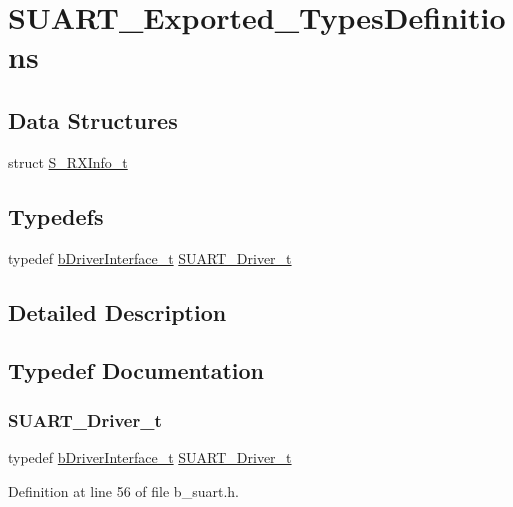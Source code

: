 \hypertarget{group___s_u_a_r_t___exported___types_definitions}{}\section{S\+U\+A\+R\+T\+\_\+\+Exported\+\_\+\+Types\+Definitions}
\label{group___s_u_a_r_t___exported___types_definitions}
\subsection*{Data Structures}
\begin{DoxyCompactItemize}
\item 
struct \mbox{\hyperlink{struct_s___r_x_info__t}{S\+\_\+\+R\+X\+Info\+\_\+t}}
\end{DoxyCompactItemize}
\subsection*{Typedefs}
\begin{DoxyCompactItemize}
\item 
typedef \mbox{\hyperlink{structb_driver_interface__t}{b\+Driver\+Interface\+\_\+t}} \mbox{\hyperlink{group___s_u_a_r_t___exported___types_definitions_ga76678b78633641a143ec958271e0bc05}{S\+U\+A\+R\+T\+\_\+\+Driver\+\_\+t}}
\end{DoxyCompactItemize}


\subsection{Detailed Description}


\subsection{Typedef Documentation}
\mbox{\label{group___s_u_a_r_t___exported___types_definitions_ga76678b78633641a143ec958271e0bc05}} 
\subsubsection{\texorpdfstring{S\+U\+A\+R\+T\+\_\+\+Driver\+\_\+t}{SUART\_Driver\_t}}
{\footnotesize\ttfamily typedef \mbox{\hyperlink{structb_driver_interface__t}{b\+Driver\+Interface\+\_\+t}} \mbox{\hyperlink{group___s_u_a_r_t___exported___types_definitions_ga76678b78633641a143ec958271e0bc05}{S\+U\+A\+R\+T\+\_\+\+Driver\+\_\+t}}}



Definition at line 56 of file b\+\_\+suart.\+h.

